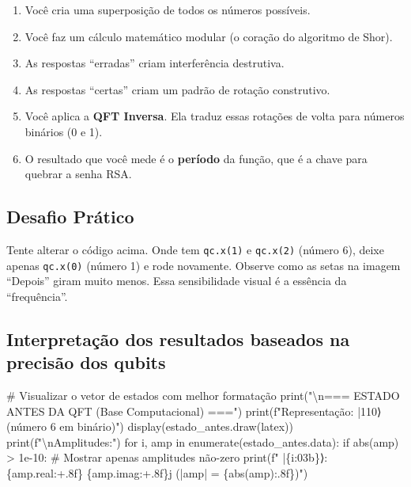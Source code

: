\documentclass[
  brazilian,
]{report}
\newenvironment{Shaded}{\begin{snugshade}}{\end{snugshade}}
\newcommand{\NormalTok}[1]{\textcolor[rgb]{0.00,0.23,0.31}{#1}}
\providecommand{\tightlist}{%
  \setlength{\itemsep}{0pt}\setlength{\parskip}{0pt}}
\begin{document}
\begin{enumerate}
\def\labelenumi{\arabic{enumi}.}
\tightlist
\item
  Você cria uma superposição de todos os números possíveis.
\item
  Você faz um cálculo matemático modular (o coração do algoritmo de
  Shor).
\item
  As respostas ``erradas'' criam interferência destrutiva.
\item
  As respostas ``certas'' criam um padrão de rotação construtivo.
\item
  Você aplica a \textbf{QFT Inversa}. Ela traduz essas rotações de volta
  para números binários (0 e 1).
\item
  O resultado que você mede é o \textbf{período} da função, que é a
  chave para quebrar a senha RSA.
\end{enumerate}

\subsection{Desafio Prático}\label{desafio-pruxe1tico}

Tente alterar o código acima. Onde tem \texttt{qc.x(1)} e
\texttt{qc.x(2)} (número 6), deixe apenas \texttt{qc.x(0)} (número 1) e
rode novamente. Observe como as setas na imagem ``Depois'' giram muito
menos. Essa sensibilidade visual é a essência da ``frequência''.

\subsection{Interpretação dos resultados baseados na precisão dos
qubits}\label{interpretauxe7uxe3o-dos-resultados-baseados-na-precisuxe3o-dos-qubits}

\begin{Shaded}
\begin{Highlighting}[]

\NormalTok{\# Visualizar o vetor de estados com melhor formatação}
\NormalTok{print("\textbackslash{}n=== ESTADO ANTES DA QFT (Base Computacional) ===")}
\NormalTok{print(f"Representação: |110⟩ (número 6 em binário)")}
\NormalTok{display(estado\_antes.draw(\textquotesingle{}latex\textquotesingle{}))}
\NormalTok{print(f"\textbackslash{}nAmplitudes:")}
\NormalTok{for i, amp in enumerate(estado\_antes.data):}
\NormalTok{    if abs(amp) \textgreater{} 1e{-}10:  \# Mostrar apenas amplitudes não{-}zero}
\NormalTok{        print(f"  |\{i:03b\}⟩: \{amp.real:+.8f\} \{amp.imag:+.8f\}j  (|amp| = \{abs(amp):.8f\})")}
\end{Highlighting}
\end{Shaded}
\end{document}
